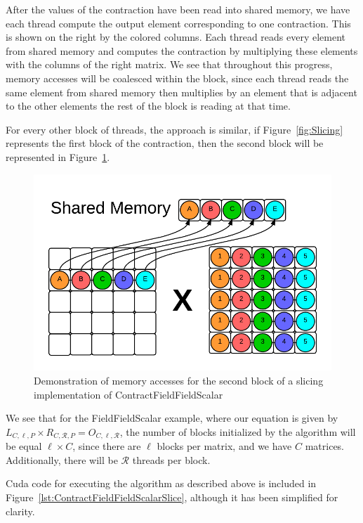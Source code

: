     After the values of the contraction have been read into shared memory, we
have each thread compute the output element corresponding to one contraction.
This is shown on the right by the colored columns. Each thread reads every
element from shared memory and computes the contraction by multiplying these
elements with the columns of the right matrix. We see that throughout this
progress, memory accesses will be coalesced within the block, since each thread
reads the same element from shared memory then multiplies by an element that is
adjacent to the other elements the rest of the block is reading at that time. 
	
    For every other block of threads, the approach is similar, if Figure~\ref{fig:Slicing}
represents the first block of the contraction, then the second block will be
represented in Figure~\ref{fig:Slicing2}. 

\begin{figure}[b]
    \centering
    \includegraphics[scale = .55]{ContractFieldFieldScalarGraphic2}
    \caption{Demonstration of memory accesses for the second block of a slicing implementation of ContractFieldFieldScalar}
\label{fig:Slicing2}
\end{figure}

We see that for the FieldFieldScalar example, where our equation is given by
$L_{C,\ell,P} \times R_{C, \mathcal{R}, P} = O_{C,\ell, \mathcal{R}}$, the
number of blocks initialized by the algorithm will be equal $\ell \times C$,
since there are $\ell$ blocks per matrix, and we have $C$ matrices.
Additionally, there will be $\mathcal{R}$ threads per block. 

    Cuda code for executing the algorithm as described above is included in Figure~\ref{lst:ContractFieldFieldScalarSlice},
although it has been simplified for clarity. 


